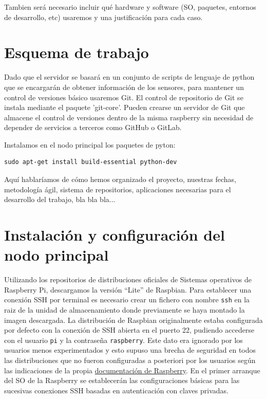 Tambien será necesario incluir qué hardware y software (SO, paquetes, entornos de desarrollo, etc) usaremos y una justificación para cada caso.



\section{Esquema de trabajo}
\label{makereference1.5}

Dado que el servidor se basará en un conjunto de scripts de lenguaje de python que se encargarán de obtener información de los sensores, para mantener un control de versiones básico usaremos Git. El control de repositorio de Git se instala mediante el paquete 'git-core'. Pueden crearse un servidor de Git que almacene el control de versiones dentro de la misma raspberry sin necesidad de depender de servicios a terceros como GitHub o GitLab.

Instalamos en el nodo principal los paquetes de pyton:
\begin{verbatim}
sudo apt-get install build-essential python-dev
\end{verbatim}

Aquí hablaríamos de cómo hemos organizado el proyecto, nuestras fechas, metodología ágil, sistema de repositorios, aplicaciones necesarias para el desarrollo del trabajo, bla bla bla...


\section{Instalación y configuración del nodo principal}
\label{makereference1.6}
 Utilizando los repositorios de distribuciones oficiales de Sistemas operativos de Raspberry Pi, descargamos la versión ``Lite'' de Raspbian. Para establecer una conexión SSH por terminal es necesario crear un fichero con nombre \verb|ssh| en la raiz de la unidad de almacenamiento donde previamente se haya montado la imagen descargada. La distribución de Raspbian originalmente estaba configurada por defecto con la conexión de SSH abierta en el puerto 22, pudiendo accederse con el usuario \verb|pi| y la contraseña \verb|raspberry|. Este dato era ignorado por los usuarios menos experimentados y esto supuso una brecha de seguridad en todos las distribuciones que no fueron configuradas a posteriori por los usuarios según las indicaciones de la propia \href{https://www.raspberrypi.org/documentation/configuration/security.md}{documentación de Raspberry}. En el primer arranque del SO de la Raspberry se establecerán las configuraciones básicas para las sucesivas conexiones SSH basadas en autenticación con claves privadas.


